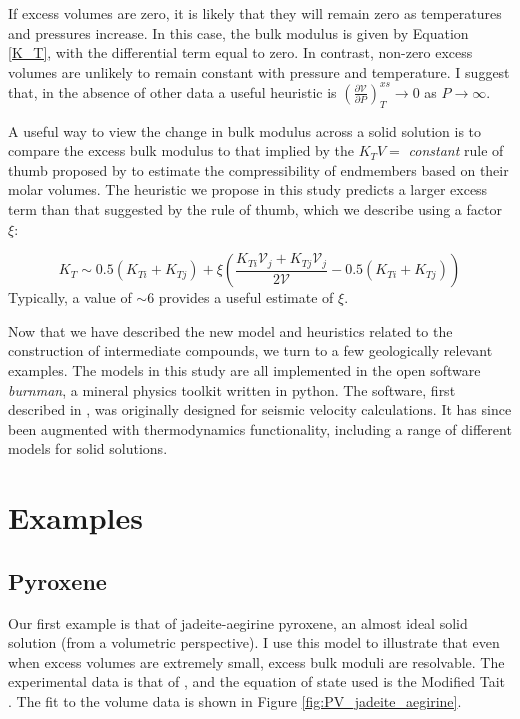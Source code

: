 \documentclass[review]{elsarticle}
\begin{document}
If excess volumes are zero, it is likely that they will remain zero as temperatures and pressures increase. In this case, the bulk modulus is given by Equation \ref{K_T}, with the differential term equal to zero. In contrast, non-zero excess volumes are unlikely to remain constant with pressure and temperature. I suggest that, in the absence of other data a useful heuristic is $\left( \frac{\partial \mathcal{V}}{\partial P} \right)_T^{xs} \rightarrow 0$ as $P \rightarrow \infty$.

A useful way to view the change in bulk modulus across a solid solution is to compare the excess bulk modulus to that implied by the $K_TV =$ \emph{constant} rule of thumb proposed by \cite{AA1970} to estimate the compressibility of endmembers based on their molar volumes. The heuristic we propose in this study predicts a larger excess term than that suggested by the rule of thumb, which we describe using a factor $\xi$:

\begin{equation}
  K_{T} \sim 0.5(K_{Ti} + K_{Tj}) + \xi \left(\frac{K_{Ti}\mathcal{V}_{j} + K_{Tj}\mathcal{V}_{j}}{2 \mathcal{V}} - 0.5(K_{Ti} + K_{Tj})\right)
  \label{K_T_heuristic}
\end{equation}
\noindent Typically, a value of $\sim$6 provides a useful estimate of $\xi$.

Now that we have described the new model and heuristics related to the construction of intermediate compounds, we turn to a few geologically relevant examples. The models in this study are all implemented in the open software \emph{burnman}, a mineral physics toolkit written in python. The software, first described in \cite{CHRU2014}, was originally designed for seismic velocity calculations. It has since been augmented with thermodynamics functionality, including a range of different models for solid solutions.

\section{Examples}
\subsection{Pyroxene}
Our first example is that of jadeite-aegirine pyroxene, an almost ideal solid solution (from a volumetric perspective). I use this model to illustrate that even when excess volumes are extremely small, excess bulk moduli are resolvable. The experimental data is that of \cite{NBLBT2006}, and the equation of state used is the Modified Tait \citep{HP2011}. The fit to the volume data is shown in Figure \ref{fig:PV_jadeite_aegirine}.
\end{document}
